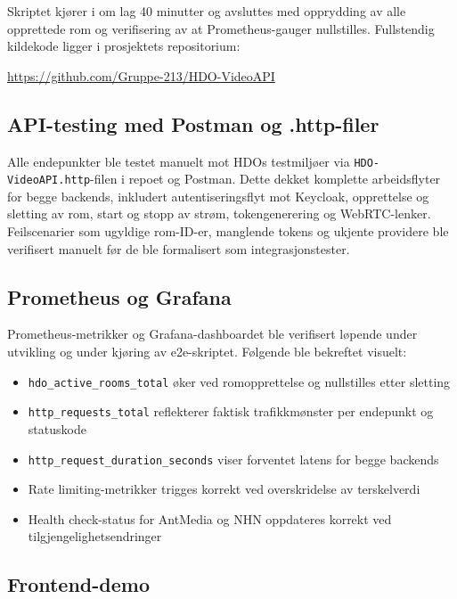 Skriptet kjører i om lag 40 minutter og avsluttes med 
opprydding av alle opprettede rom og verifisering av at 
Prometheus-gauger nullstilles. Fullstendig kildekode 
ligger i prosjektets repositorium:

\begin{center}
\url{https://github.com/Gruppe-213/HDO-VideoAPI}
\end{center}

\subsection{API-testing med Postman og .http-filer}
\label{subsec:postman}

Alle endepunkter ble testet manuelt mot HDOs testmiljøer 
via \texttt{HDO-VideoAPI.http}-filen i repoet og Postman. 
Dette dekket komplette arbeidsflyter for begge backends, 
inkludert autentiseringsflyt mot Keycloak, opprettelse 
og sletting av rom, start og stopp av strøm, 
tokengenerering og WebRTC-lenker. Feilscenarier som 
ugyldige rom-ID-er, manglende tokens og ukjente 
providere ble verifisert manuelt før de ble formalisert 
som integrasjonstester.

\subsection{Prometheus og Grafana}
\label{subsec:grafana}

Prometheus-metrikker og Grafana-dashboardet ble 
verifisert løpende under utvikling og under kjøring 
av e2e-skriptet. Følgende ble bekreftet visuelt:

\begin{itemize}
    \item \texttt{hdo\_active\_rooms\_total} øker ved 
          romopprettelse og nullstilles etter sletting
    \item \texttt{http\_requests\_total} reflekterer 
          faktisk trafikkmønster per endepunkt og 
          statuskode
    \item \texttt{http\_request\_duration\_seconds} 
          viser forventet latens for begge backends
    \item Rate limiting-metrikker trigges korrekt ved 
          overskridelse av terskelverdi
    \item Health check-status for AntMedia og NHN 
          oppdateres korrekt ved tilgjengelighetsendringer
\end{itemize}

\subsection{Frontend-demo}
\label{subsec:frontend-demo}

